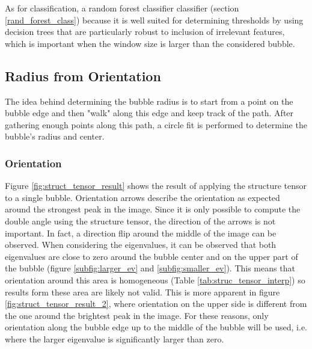 		As for classification, a random forest classifier classifier (section \ref{rand_forest_class}) because it is well suited for determining thresholds by using decision trees that are particularly robust to inclusion of irrelevant features, which is important when the window size is larger than the considered bubble.
		
		
		
	
	\subsection{Radius from Orientation}\label{radius_from_orientation}
		The idea behind determining the bubble radius is to start from a point on the bubble edge and then "walk" along this edge and keep track of the path. After gathering enough points along this path, a circle fit is performed to determine the bubble's radius and center. 
		
		\subsubsection{Orientation}
		
		Figure \ref{fig:struct_tensor_result} shows the result of applying the structure tensor to a single bubble. Orientation arrows describe the orientation as expected around the strongest peak in the image. Since it is only possible to compute the double angle using the structure tensor, the direction of the arrows is not important. In fact, a direction flip around the middle of the image can be observed. When considering the eigenvalues, it can be observed that both eigenvalues are close to zero around the bubble center and on the upper part of the bubble (figure \ref{subfig:larger_ev} and \ref{subfig:smaller_ev}). 
		This means that orientation around this area is homogeneous (Table \ref{tab:struc_tensor_interp}) so results form these area are likely not valid. This is more apparent in figure \ref{fig:struct_tensor_result_2}, where orientation on the upper side is different from the one around the brightest peak in the image. For these reasons, only orientation along the bubble edge up to the middle of the bubble will be used, i.e. where the larger eigenvalue is significantly larger than zero.
		
